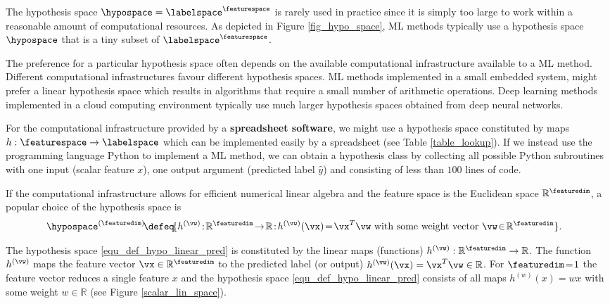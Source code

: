 \documentclass[12pt]{report}
\begin{document}
The hypothesis space $\hypospace = \labelspace^{\featurespace}$ 
is rarely used in practice since it is simply too large to work 
within a reasonable amount of computational resources.  
As depicted in Figure \ref{fig_hypo_space}, ML methods 
typically use a hypothesis space $\hypospace$ that is a tiny 
subset of $\labelspace^{\featurespace}$.  

The preference for a particular hypothesis space often depends 
on the available computational infrastructure available to a ML method. 
Different computational infrastructures favour different hypothesis 
spaces. ML methods implemented in a small embedded system, might 
prefer a linear hypothesis space which results in algorithms that require 
a small number of arithmetic operations. Deep learning methods 
implemented in a cloud computing environment typically use much larger 
hypothesis spaces obtained from deep neural networks. 

For the computational infrastructure provided by a {\bf spreadsheet software}, 
we might use a hypothesis space constituted by maps $h: \featurespace \rightarrow \labelspace$ 
which can be implemented easily by a spreadsheet (see Table \ref{table_lookup}). 
If we instead use the programming language Python to implement 
a ML method, we can obtain a hypothesis class by collecting all possible 
Python subroutines with one input (scalar feature $x$), one output 
argument (predicted label $\hat{y}$) and consisting of less than $100$ 
lines of code. %

If the computational infrastructure allows for efficient numerical 
linear algebra and the feature space is the Euclidean space $\mathbb{R}^{\featuredim}$, 
a popular choice of the hypothesis space is  
\begin{align}
\label{equ_def_hypo_linear_pred}
\hspace*{-3mm}\hypospace^{(\featuredim)} \!\defeq\!\{ h^{(\vw)}\!:\!\mathbb{R}^{\featuredim}\!\rightarrow\!\mathbb{R}\!:\!h^{(\vw)}(\vx)\!=\!\vx^{T} \vw \mbox{ with some weight vector } \vw\!\in\!\mathbb{R}^{\featuredim} \}.  
\end{align}

The hypothesis space \eqref{equ_def_hypo_linear_pred} is constituted 
by the linear maps (functions) $h^{(\vw)}: \mathbb{R}^{\featuredim} \rightarrow \mathbb{R}$. 
The function $h^{(\vw)}$ maps the feature vector $\vx \in \mathbb{R}^{\featuredim}$ 
to the predicted label (or output) $h^{(\vw)}(\vx) = \vx^{T} \vw \in \mathbb{R}$. 
For $\featuredim\!=\!1$ the feature vector reduces a single feature $x$ and 
the hypothesis space \eqref{equ_def_hypo_linear_pred} consists of all maps 
$h^{(w)}(x) = w x$ with some weight $w \in \mathbb{R}$ (see Figure \ref{scalar_lin_space}). 
\end{document}
